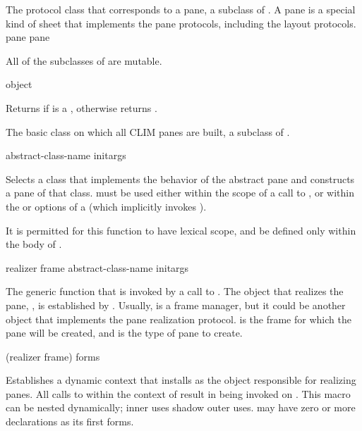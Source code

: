 
The protocol class that corresponds to a pane, a subclass of .  A pane
is a special kind of sheet that implements the pane protocols, including the
layout protocols.
 {pane} {pane}

All of the subclasses of  are mutable.

 {object}

Returns  if  is a , otherwise returns
.


The basic class on which all CLIM panes are built, a subclass of .
\AbstractClass


 {abstract-class-name \rest initargs}

Selects a class that implements the behavior of the abstract pane
 and constructs a pane of that class.  
must be used either within the scope of a call to
, or within the  or 
options of a  (which implicitly invokes
).

It is permitted for this function to have lexical scope, and be defined only
within the body of .


 {realizer frame abstract-class-name \rest initargs}

The generic function that is invoked by a call to .  The object
that realizes the pane, , is established by
.  Usually,  is a frame
manager, but it could be another object that implements the pane realization
protocol.   is the frame for which the pane will be created, and
 is the type of pane to create.

 {(realizer frame) \body forms}

Establishes a dynamic context that installs  as the object
responsible for realizing panes.  All calls to  within the context
of  result in  being invoked
on .  This macro can be nested dynamically; inner uses shadow
outer uses.   may have zero or more declarations as its first forms.

